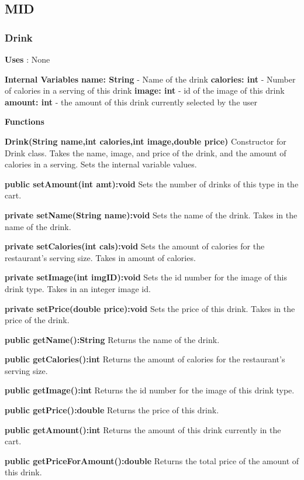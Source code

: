 \documentclass [10pt]{article}
\begin{document}
\subsection{MID}

\subsubsection{Drink}

\textbf{Uses} : None

\textbf{Internal Variables}
\textbf{name: String} - Name of the drink
\textbf{calories: int} - Number of calories in a serving of this drink
\textbf{image: int} - id of the image of this drink
\textbf{amount: int} - the amount of this drink currently selected by the user

\textbf{Functions}

\textbf{Drink(String name,int calories,int image,double price)}
Constructor for Drink class. Takes the name, image, and price of the drink, and the amount of calories in a serving. Sets the internal variable values.

\textbf{public setAmount(int amt):void}
Sets the number of drinks of this type in the cart.

\textbf{private setName(String name):void}
Sets the name of the drink. Takes in the name of the drink.

\textbf{private setCalories(int cals):void}
Sets the amount of calories for the restaurant’s serving size. Takes in amount of calories.

\textbf{private setImage(int imgID):void}
Sets the id number for the image of this drink type. Takes in an integer image id.

\textbf{private setPrice(double price):void}
Sets the price of this drink. Takes in the price of the drink.

\textbf{public getName():String}
Returns the name of the drink.

\textbf{public getCalories():int}
Returns the amount of calories for the restaurant’s serving size.

\textbf{public getImage():int}
Returns the id number for the image of this drink type.

\textbf{public getPrice():double}
Returns the price of this drink.

\textbf{public getAmount():int}
Returns the amount of this drink currently in the cart.

\textbf{public getPriceForAmount():double}
Returns the total price of the amount of this drink.
\end{document}

